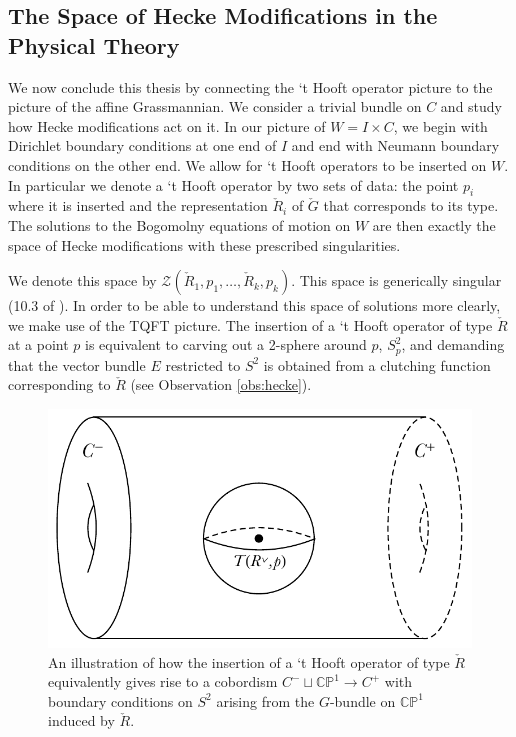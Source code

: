 	\subsection{The Space of Hecke Modifications in the Physical Theory}
	
	We now conclude this thesis by connecting the `t Hooft operator picture to the picture of the affine Grassmannian. We consider a trivial bundle on $C$ and study how Hecke modifications act on it. In our picture of $W = I \times C$, we begin with Dirichlet boundary conditions at one end of $I$ and end with Neumann boundary conditions on the other end. We allow for `t Hooft operators to be inserted on $W$. In particular we denote a `t Hooft operator by two sets of data: the point $p_i$ where it is inserted and the representation $\check R_i$ of $\check G$ that corresponds to its type. The solutions to the Bogomolny equations of motion on $W$ are then exactly the space of Hecke modifications with these prescribed singularities.
	
	We denote this space by $\mathcal Z(\check R_1, p_1, \dots, \check R_k, p_k)$. This space is generically singular (10.3 of \cite{kapustin2006}). In order to be able to understand this space of solutions more clearly, we make use of the TQFT picture. The insertion of a `t Hooft operator of type $\check R$ at a point $p$ is equivalent to carving out a 2-sphere around $p$, $S^2_p$, and demanding that the vector bundle $E$ restricted to $S^2$ is obtained from a clutching function corresponding to $\check R$ (see Observation \ref{obs:hecke}).
	
	\begin{figure}[h]
		\centering
		\includegraphics[scale=0.8]{Figures/Hooft2}
		\caption{An illustration of how the insertion of a `t Hooft operator of type $\check R$ equivalently gives rise to a cobordism $C^- \sqcup \mathbb{CP}^1 \to C^+$ with boundary conditions on $S^2$ arising from the $G$-bundle on $\mathbb{CP}^1$ induced by $\check R$.}
		\label{fig:hooft2}
	\end{figure}
	

